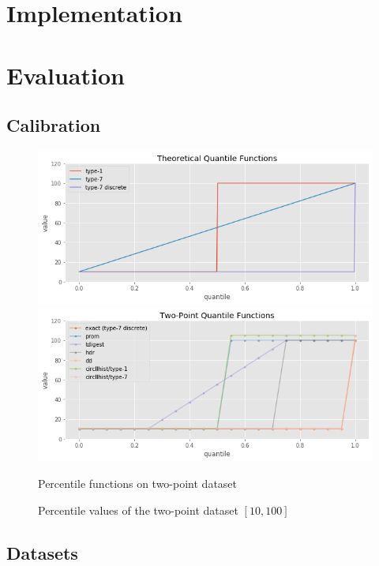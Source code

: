 \documentclass{article}
\theoremstyle{plain}
\theoremstyle{remark}
\begin{document}
\section{Implementation}

\section{Evaluation}

\clearpage
\subsection{Calibration}

\begin{figure}
   \includegraphics[width=\textwidth]{evaluation/images/quantile_comparison.png}
   \includegraphics[width=\textwidth]{evaluation/images/Two_Points_quantile_comparison.png}
   \caption{Percentile functions on two-point dataset}
\end{figure}

\begin{figure}
  \centering
  
  \caption{Percentile values of the two-point dataset $[10,100]$}
\end{figure}

\clearpage
\subsection{Datasets}
\end{document}
